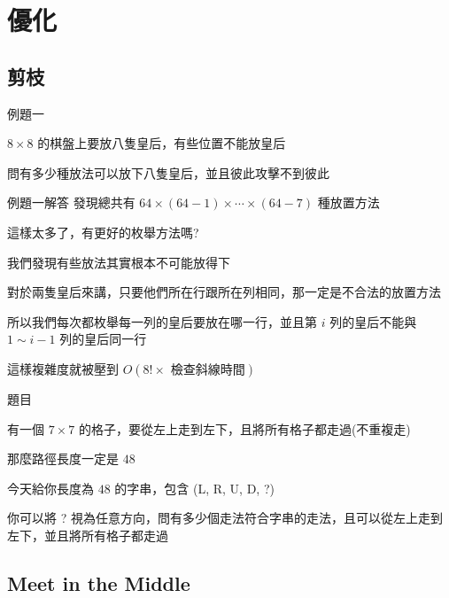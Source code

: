 
\section{優化}

\subsection{剪枝}

\begin{frame}{例題一}
    \begin{problem}
        $8 \times 8$ 的棋盤上要放八隻皇后，有些位置不能放皇后

        問有多少種放法可以放下八隻皇后，並且彼此攻擊不到彼此
    \end{problem}
\end{frame}

\begin{frame}{例題一解答}
    發現總共有 $64 \times (64-1) \times \cdots \times (64-7)$ 種放置方法

    這樣太多了，有更好的枚舉方法嗎?\pause

    我們發現有些放法其實根本不可能放得下

    對於兩隻皇后來講，只要他們所在行跟所在列相同，那一定是不合法的放置方法

    所以我們每次都枚舉每一列的皇后要放在哪一行，並且第 $i$ 列的皇后不能與 $1 \sim i-1$ 列的皇后同一行

    這樣複雜度就被壓到 $O(8! \times \text{ 檢查斜線時間})$
\end{frame}

\begin{frame}{題目}
    \begin{exercise}
        有一個 $7 \times 7$ 的格子，要從左上走到左下，且將所有格子都走過(不重複走)

        那麼路徑長度一定是 $48$

        今天給你長度為 $48$ 的字串，包含 (L, R, U, D, ?)

        你可以將 ? 視為任意方向，問有多少個走法符合字串的走法，且可以從左上走到左下，並且將所有格子都走過
    \end{exercise}
\end{frame}

\subsection{Meet in the Middle}

